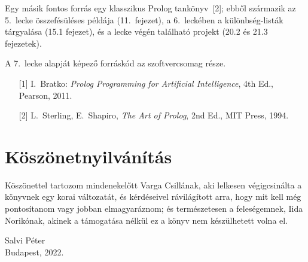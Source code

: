 Egy másik fontos forrás egy klasszikus Prolog tankönyv~[2]; ebből
származik az 5.~lecke összefésüléses példája (11.~fejezet), a
6.~leckében a különbség-listák tárgyalása (15.1 fejezet), és a
lecke végén található projekt (20.2 és 21.3 fejezetek).

A 7.~lecke alapját képező forráskód az 
szoftvercsomag része.

\begin{itemize}[leftmargin=2cm,itemindent=-1cm,labelsep=1cm-2em]
\item[{[1]}] I.~Bratko: \emph{Prolog Programming for Artificial
Intelligence}, 4th Ed., Pearson, 2011.
\item[{[2]}] L.~Sterling, E.~Shapiro, \emph{The Art of Prolog}, 2nd
  Ed., MIT Press, 1994.
\end{itemize}

\section*{Köszönetnyilvánítás}
Köszönettel tartozom mindenekelőtt Varga Csillának, aki lelkesen
végigcsinálta a könyvnek egy korai változatát, és kérdéseivel
rávilágított arra, hogy mit kell még pontosítanom vagy jobban
elmagyaráznom; és természetesen a feleségemnek, Iida Norikónak, akinek
a támogatása nélkül ez a könyv nem készülhetett volna el.

\begin{flushright}
  Salvi Péter\\
  Budapest, 2022.
\end{flushright}
